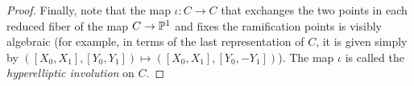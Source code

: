 \begin{proof}
  Finally, note that the map $\iota : C \to C$ that exchanges the two points in each reduced fiber of the map $C \to \PP^1$ and fixes the ramification points is visibly algebraic (for example, in terms of the last representation of $C$, it is given simply by $([X_0,X_1], [Y_0,Y_1]) \mapsto  ([X_0,X_1], [Y_0,-Y_1]) $). The map $\iota$ is called the \emph{hyperelliptic involution} on $C$.



%  
%  
%  
% 
%
%


\end{proof}
